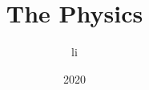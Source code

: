 \documentclass[a4paper, 11pt]{book}
\begin{document}
\author{li}
\title{The Physics}
\date{2020}

\frontmatter
\maketitle
\tableofcontents

\mainmatter


\end{document}

